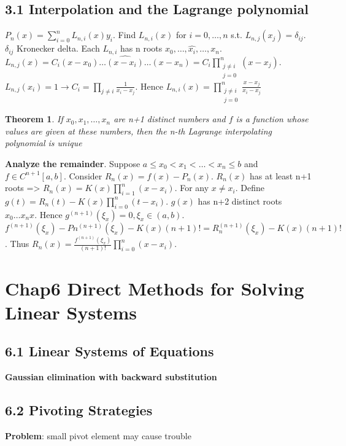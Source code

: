 \documentclass[11pt]{article}
\newtheorem{theorem}{Theorem}[section]
\begin{document}
\subsection{3.1 Interpolation and the Lagrange polynomial}
\label{sec:org56371d3}
\(P_n(x)=\displaystyle\sum_{i=0}^nL_{n,i}(x)y_i\). Find \(L_{n,i}(x)\) for
\(i=0,\dots,n\) s.t. \(L_{n,j}(x_j)=\delta_{ij}\). \(\delta_{ij}\) Kronecker delta.
Each \(L_{n,i}\) has n roots \(x_0,\dots,\hat{x_i},\dots,x_n\).
\(L_{n,j}(x)=C_i(x-x_0)\dots\hat{(x-x_i)}\dots(x-x_n)=C_i \displaystyle
   \prod_{\substack{j\neq i\\j=0}}^n(x-x_j)\).
\(L_{n,j}(x_i)=1\to C_i=\displaystyle\prod_{j\neq i}\frac{1}{x_i-x_j}\).
Hence \(L_{n,i}(x)=\displaystyle\prod_{\substack{j\neq i\\j=0}}^n
   \frac{x-x_j}{x_i-x_j}\)

\begin{theorem}
If $x_0,x_1,\dots,x_n$ are n+1 distinct numbers and $f$ is a function whose values
are given at these numbers, then the n-th Lagrange interpolating polynomial 
is unique
\end{theorem}


\textbf{Analyze the remainder}. Suppose \(a\le x_0<x_1<\dots<x_n\le b\) and \(f\in
   C^{n+1}[a,b]\). Consider \(R_n(x)=f(x)-P_n(x)\).
\(R_n(x)\) has at least n+1 roots =>
\(R_n(x)=K(x)\displaystyle\prod_{i=1}^n(x-x_i)\).
For any \(x\neq x_i\). Define
\(g(t)=R_n(t)-K(x)\displaystyle\prod_{i=0}^n(t-x_i)\). \(g(x)\) has n+2 distinct
roots \(x_0\dots x_n x\). Hence \(g^{(n+1)}(\xi_x)=0,\xi_x\in(a,b)\).
\(f^{(n+1)}(\xi_x)-Pn^{(n+1)}(\xi_x)-K(x)(n+1)!=R_n^{(n+1)}(\xi_x)-K(x)(n+1)!\).
Thus \(R_n(x)=\frac{f^{(n+1)}(\xi_x)}{(n+1)!}\displaystyle\prod_{i=0}^n(x-x_i)\).
\section{Chap6 Direct Methods for Solving Linear Systems}
\label{sec:org3925d9a}
\subsection{6.1 Linear Systems of Equations}
\label{sec:org9aab32c}
\textbf{Gaussian elimination with backward substitution}
\subsection{6.2 Pivoting Strategies}
\label{sec:org9d3185f}
\textbf{Problem}: small pivot element may cause trouble
\end{document}
